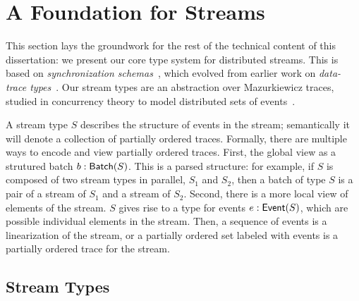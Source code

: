 \chapter{A Foundation for Streams}
\label{cha:foundation}

This section lays the groundwork for the rest of the technical content of this dissertation: we present our core type system for distributed streams. This is based on \emph{synchronization schemas}~, which evolved from earlier work on \emph{data-trace types}~.
Our stream types are an abstraction over Mazurkiewicz traces, studied in concurrency theory to model distributed sets of events~\cite{mazurkiewicz1986trace,DiekertR1995}.

A stream type $S$ describes the structure of events in the stream;
semantically it will denote a collection of partially ordered traces.
Formally, there are multiple ways to encode and view partially ordered traces.
First, the global view as a strutured batch $b: \mathsf{Batch}({S})$.
This is a parsed structure: for example, if $S$ is composed of two stream types in parallel, $S_1$ and $S_2$, then a batch of type $S$ is a pair of a stream of $S_1$ and a stream of $S_2$.
Second, there is a more local view of elements of the stream.
$S$ gives rise to a type for events $e: \mathsf{Event}({S})$,
which are possible individual elements in the stream.
Then, a sequence of events is a linearization of the stream,
or a partially ordered set labeled with events is a partially ordered trace
for the stream.

\section{Stream Types}


